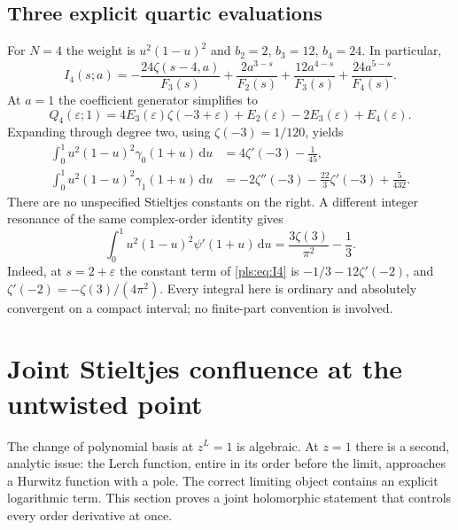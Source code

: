 \documentclass[11pt,letterpaper]{article}
\numberwithin{equation}{section}
\theoremstyle{definition}
\theoremstyle{remark}\newtheorem{remark}[theorem]{Remark}
\newcommand{\dd}{\,\mathrm d}
\begin{document}
\subsection{Three explicit quartic evaluations}

For $N=4$ the weight is $u^2(1-u)^2$ and $b_2=2$, $b_3=12$,
$b_4=24$. In particular,
\begin{equation}\label{pls:eq:I4}
 I_4(s;a)=-\frac{24\zeta(s-4,a)}{F_3(s)}
       +\frac{2a^{3-s}}{F_2(s)}+\frac{12a^{4-s}}{F_3(s)}
                                      +\frac{24a^{5-s}}{F_4(s)}.
\end{equation}
At $a=1$ the coefficient generator simplifies to
\[
 Q_4(\varepsilon;1)
   =4E_3(\varepsilon)\zeta(-3+\varepsilon)
               +E_2(\varepsilon)-2E_3(\varepsilon)+E_4(\varepsilon).
\]
Expanding through degree two, using $\zeta(-3)=1/120$, yields
\begin{align}
 \int_0^1u^2(1-u)^2\gamma_0(1+u)\dd u
   &=4\zeta'(-3)-\frac1{45},\label{pls:eq:gamma0quartic}\\
 \int_0^1u^2(1-u)^2\gamma_1(1+u)\dd u
   &=-2\zeta''(-3)-\frac{22}{3}\zeta'(-3)+\frac5{432}.
                                            \label{pls:eq:gamma1quartic}
\end{align}
There are no unspecified Stieltjes constants on the right. A different
integer resonance of the same complex-order identity gives
\begin{equation}\label{pls:eq:trigammaquartic}
 \boxed{\displaystyle
 \int_0^1u^2(1-u)^2\psi'(1+u)\dd u
          =\frac{3\zeta(3)}{\pi^2}-\frac13.}
\end{equation}
Indeed, at $s=2+\varepsilon$ the constant term of
\eqref{pls:eq:I4} is $-1/3-12\zeta'(-2)$, and
$\zeta'(-2)=-\zeta(3)/(4\pi^2)$. Every integral here is ordinary
and absolutely convergent on a compact interval; no finite-part
convention is involved.

\section{Joint Stieltjes confluence at the untwisted point}
\label{pls:sec:confluence}

The change of polynomial basis at $z^L=1$ is algebraic. At $z=1$
there is a second, analytic issue: the Lerch function, entire in its
order before the limit, approaches a Hurwitz function with a pole.
The correct limiting object contains an explicit logarithmic term.
This section proves a joint holomorphic statement that controls every
order derivative at once.
\end{document}
